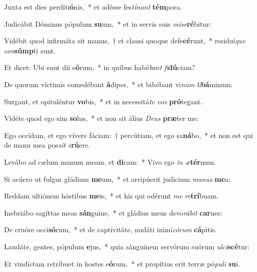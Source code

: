 \item Juxta est dies perditi\textbf{ó}nis,~* et adésse fes\textit{tí}\textit{nant} \textbf{tém}pora.
\item Judicábit Dóminus pópulum \textbf{su}um,~* et in servis suis \textit{mi}\textit{se}\textbf{ré}bitur:
\item Vidébit quod infirmáta sit manus,~† et clausi quoque defe\textbf{cé}runt,~* residuí\textit{que} \textit{con}\textbf{súmp}ti sunt.
\item Et dicet: Ubi sunt dii e\textbf{ó}rum,~* in quibus habé\textit{bant} \textit{fi}\textbf{dú}ciam?
\item De quorum víctimis comedébant \textbf{á}dipes,~* et bibébant vi\textit{num} \textit{li}\textbf{bá}minum:
\item Surgant, et opituléntur \textbf{vo}bis,~* et in necessitá\textit{te} \textit{vos} \textbf{pró}tegant.
\item Vidéte quod ego sim \textbf{so}lus,~* et non sit álius \textit{De}\textit{us} \textbf{præ}ter me:
\item Ego occídam, et ego vívere fáciam:~† percútiam, et ego sa\textbf{ná}bo,~* et non est qui de manu mea pos\textit{sit} \textit{e}\textbf{rú}ere.
\item Levábo ad cælum manum meam, et \textbf{di}cam:~* Vivo ego \textit{in} \textit{æ}\textbf{tér}num.
\item Si acúero ut fulgur gládium \textbf{me}um,~* et arripúerit judícium \textit{ma}\textit{nus} \textbf{me}a:
\item Reddam ultiónem hóstibus \textbf{me}is,~* et his qui odérunt \textit{me} \textit{re}\textbf{trí}buam.
\item Inebriábo sagíttas meas \textbf{sán}guine,~* et gládius meus devo\textit{rá}\textit{bit} \textbf{car}nes:
\item De cruóre occi\textbf{só}rum,~* et de captivitáte, nudáti inimi\textit{có}\textit{rum} \textbf{cá}pitis.
\item Laudáte, gentes, pópulum \textbf{e}jus,~* quia sánguinem servórum suórum \textit{ul}\textit{ci}\textbf{scé}tur:
\item Et vindíctam retríbuet in hostes e\textbf{ó}rum,~* et propítius erit terræ pó\textit{pu}\textit{li} \textbf{su}i.
